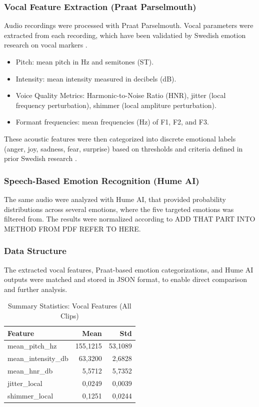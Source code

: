 \subsubsection{Vocal Feature Extraction (Praat Parselmouth)}
Audio recordings were processed with Praat Parselmouth. Vocal parameters were extracted from each recording, which have been validatied by Swedish emotion research on vocal markers \autocite{Ekberg2023}. 
\begin{itemize}
    \item Pitch: mean pitch in Hz and semitones (ST). 
    \item Intensity: mean intensity measured in decibels (dB). 
    \item Voice Quality Metrics: Harmonic-to-Noise Ratio (HNR), jitter (local frequency perturbation), shimmer (local ampliture perturbation). 
    \item Formant frequencies: mean frequencies (Hz) of F1, F2, and F3. 
\end{itemize}
These acoustic features were then categorized into discrete emotional labels (anger, joy, sadness, fear, surprise) based on thresholds and criteria defined in prior Swedish research \autocite{Ekberg2023}. 

\subsubsection{Speech-Based Emotion Recognition (Hume AI)}
The same audio were analyzed with Hume AI, that provided probability distributions across several emotions, where the five targeted emotions was filtered from. 
The results were normalized according to ADD THAT PART INTO METHOD FROM PDF REFER TO HERE. 

\subsubsection{Data Structure}
The extracted vocal features, Praat-based emotion categorizations, and Hume AI outputs were matched and stored in JSON format, to enable direct comparison and further analysis. 

\begin{table}[H]
    \centering
    \begin{tabular}{lrr}
      \toprule
      \textbf{Feature}          & \textbf{Mean}   & \textbf{Std}    \\
      \midrule
      mean\_pitch\_hz           & 155,1215        & 53,1089         \\
      mean\_intensity\_db       & 63,3200         & 2,6828          \\
      mean\_hnr\_db             & 5,5712          & 5,7352          \\
      jitter\_local             & 0,0249          & 0,0039          \\
      shimmer\_local            & 0,1251          & 0,0244          \\
      \bottomrule
    \end{tabular}
    \caption{Summary Statistics: Vocal Features (All Clips)}
    \label{tab:summary_vocal_features}
  \end{table}

